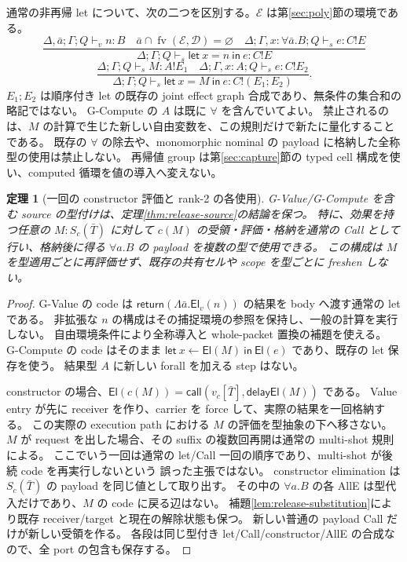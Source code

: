 \documentclass[11pt,a4paper]{article}
\newtheorem{theorem}[definition]{定理}
\newcommand{\Ret}{\mathsf{return}}
\newcommand{\Call}{\mathsf{call}}
\newcommand{\Delay}{\mathsf{delay}}
\newcommand{\El}{\mathsf{El}}
\newcommand{\fv}{\operatorname{fv}}
\newcommand{\D}{\mathcal D}
\begin{document}
通常の非再帰 let について、次の二つを区別する。\(\mathcal E\) は第\ref{sec:poly}節の環境である。
\[
 \frac{\Delta,\bar a;\Gamma;Q\vdash_v n:B
       \quad\bar a\cap\fv(\mathcal E,\D)=\varnothing
       \quad\Delta;\Gamma,x:\forall\bar a.B;Q\vdash_s e:C!E}
      {\Delta;\Gamma;Q\vdash_s\mathsf{let}\ x=n\ \mathsf{in}\ e:C!E}
 \tag{G-Value}
\]
\[
 \frac{\Delta;\Gamma;Q\vdash_s M:A!E_1
       \quad\Delta;\Gamma,x:A;Q\vdash_s e:C!E_2}
      {\Delta;\Gamma;Q\vdash_s\mathsf{let}\ x=M\ \mathsf{in}\ e:C!(E_1;E_2)}.
 \tag{G-Compute}
\]
\(E_1;E_2\) は順序付き let の既存の joint effect graph 合成であり、無条件の集合和の略記ではない。
G-Compute の \(A\) は既に \(\forall\) を含んでいてよい。
禁止されるのは、\(M\) の計算で生じた新しい自由変数を、この規則だけで新たに量化することである。
既存の \(\forall\) の除去や、monomorphic nominal の payload に格納した全称型の使用は禁止しない。
再帰値 group は第\ref{sec:capture}節の typed cell 構成を使い、computed 循環を値の導入へ変えない。

\begin{theorem}[一回の constructor 評価と rank-2 の各使用]
\label{thm:constructor-once}
G-Value/G-Compute を含む source の型付けは、定理\ref{thm:release-source}の結論を保つ。
特に、効果を持つ任意の \(M:S_c(\bar T)\) に対して \(c(M)\) の受領・評価・格納を通常の
Call として行い、格納後に得る \(\forall a.B\) の payload を複数の型で使用できる。
この構成は \(M\) を型適用ごとに再評価せず、既存の共有セルや scope を型ごとに freshen しない。
\end{theorem}
\begin{proof}
G-Value の code は \(\Ret(\Lambda\bar a.\El_v(n))\) の結果を body へ渡す通常の let である。
非拡張な \(n\) の構成はその捕捉環境の参照を保持し、一般の計算を実行しない。
自由環境条件により全称導入と whole-packet 置換の補題を使える。
G-Compute の code はそのまま
\(\mathsf{let}\ x\leftarrow\El(M)\ \mathsf{in}\ \El(e)\) であり、既存の let 保存を使う。
結果型 \(A\) に新しい forall を加える step はない。

constructor の場合、\(\El(c(M))=\Call(v_c[\bar T],\Delay\El(M))\) である。
Value entry が先に receiver を作り、carrier を force して、実際の結果を一回格納する。
この実際の execution path における \(M\) の評価を型抽象の下へ移さない。
\(M\) が request を出した場合、その suffix の複数回再開は通常の multi-shot 規則による。
ここでいう一回は通常の let/Call 一回の順序であり、multi-shot が後続 code を再実行しないという
誤った主張ではない。
constructor elimination は \(S_c(\bar T)\) の payload を同じ値として取り出す。
その中の \(\forall a.B\) の各 AllE は型代入だけであり、\(M\) の code に戻る辺はない。
補題\ref{lem:release-substitution}により既存 receiver/target と現在の解除状態も保つ。
新しい普通の payload Call だけが新しい受領を作る。
各段は同じ型付き let/Call/constructor/AllE の合成なので、全 port の包含も保存する。
\end{proof}
\end{document}

